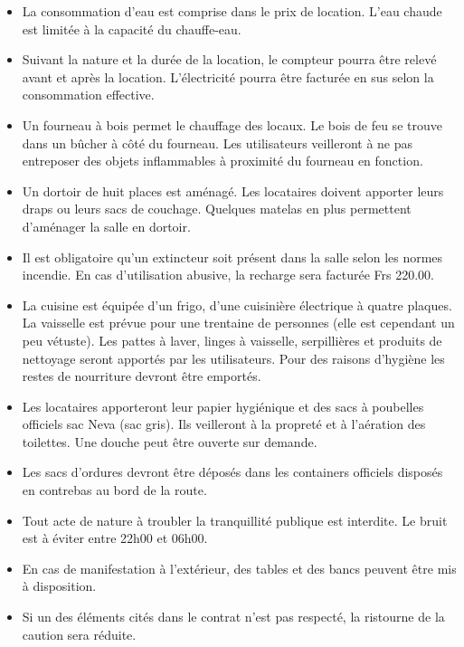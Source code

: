 \documentclass[a4paper,12pt]{extarticle}
\begin{document}
\begin{itemize}
\item La consommation d'eau est comprise dans le prix de location.
L'eau chaude est limitée à la capacité du chauffe-eau.

\item Suivant la nature et la durée de la location, le compteur pourra être relevé avant et après la location.
L'électricité pourra être facturée en sus selon la consommation effective.

\item Un fourneau à bois permet le chauffage des locaux. Le bois de feu se trouve dans un bûcher à côté du fourneau.
Les utilisateurs veilleront à ne pas entreposer des objets inflammables à proximité du fourneau en fonction.

\item Un dortoir de huit places est aménagé. Les locataires doivent apporter leurs draps
ou leurs sacs de couchage. Quelques matelas en plus permettent d'aménager la salle
en dortoir.

\item Il est obligatoire qu'un extincteur soit présent dans la salle selon les normes incendie.
En cas d'utilisation abusive, la recharge sera facturée Frs 220.00.

\item La cuisine est équipée d'un frigo, d'une cuisinière électrique à quatre plaques.
La vaisselle est prévue pour une trentaine de personnes (elle est cependant un peu vétuste).
Les pattes à laver, linges à vaisselle, serpillières et produits de nettoyage seront apportés par les utilisateurs.
Pour des raisons d'hygiène les restes de nourriture devront être emportés.

\item Les locataires apporteront leur papier hygiénique et des sacs à poubelles officiels sac Neva (sac gris).
Ils veilleront à la propreté et à l'aération des toilettes.
Une douche peut être ouverte sur demande.

\item Les sacs d'ordures devront être déposés dans les containers officiels disposés en contrebas au bord de la route.

\item Tout acte de nature à troubler la tranquillité publique est interdite. Le bruit est à éviter entre 22h00 et 06h00.

\item En cas de manifestation à l'extérieur, des tables et des bancs peuvent être mis à disposition.

\item Si un des éléments cités dans le contrat n'est pas respecté, la ristourne de la caution sera réduite.
\end{itemize}
\end{document}
